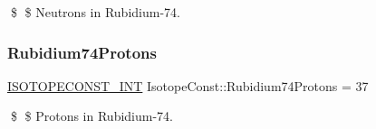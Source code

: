 \$ \$ Neutrons in Rubidium-\/74. \mbox{\label{group___isotope_const-_rubidium-_rb74_gafbb216a8766120eacda72fa4f3c6fd52}} 
\subsubsection{\texorpdfstring{Rubidium74\+Protons}{Rubidium74Protons}}
{\footnotesize\ttfamily \mbox{\hyperlink{group___isotope_const-_macros_ga5f18360b3e99483a35c32d789e62621c}{I\+S\+O\+T\+O\+P\+E\+C\+O\+N\+S\+T\+\_\+\+I\+NT}} Isotope\+Const\+::\+Rubidium74\+Protons = 37}

\$ \$ Protons in Rubidium-\/74. 
